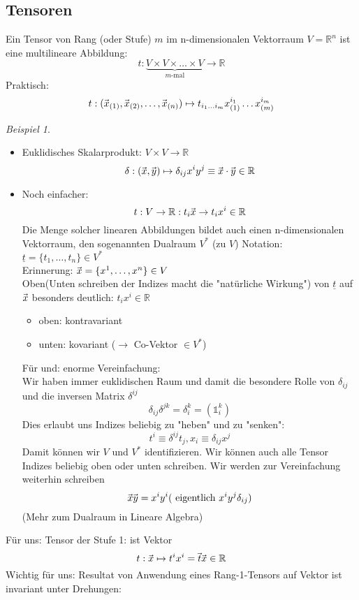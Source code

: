 \documentclass[a4paper]{scrartcl}
\renewcommand{\v}[1]{\mathrlap{\vec{\mkern-2mu\phantom{#1}}}#1}
\theoremstyle{definition}
\theoremstyle{plain}
\theoremstyle{remark}
\theoremstyle{remark}
\newtheorem{ex}{Beispiel}
\newcommand{\ubar}[1]{\underline{#1}}
\begin{document}
\subsection{Tensoren}
\label{sec-6-4}
Ein Tensor von Rang (oder Stufe) $m$ im n-dimensionalen Vektorraum $V = \mathbb{R}^n$ ist eine multilineare Abbildung:
\[t:\underbrace{V\times V\times \ldots \times V}_{m\text{-mal}} \to \mathbb{R}\]
Praktisch:
\[t: (\v x_{(1)}, \v x_{(2)}, \ldots, \v x_{(n)}) \mapsto t_{i_1 \ldots i_m} x_{(1)}^{i_1} \ldots x_{(m)}^{i_m} \]
\begin{ex}
\begin{itemize}
\item Euklidisches Skalarprodukt: $V\times V \to \mathbb{R}$
     \[\delta: (\v x, \v y) \mapsto \delta_{ij} x^i y^j \equiv \v x \cdot \v y \in \mathbb{R}\]
\item Noch einfacher:
\[t: V \to \mathbb{R}: t_i \v x \to t_i x^i \in \mathbb{R}\]
Die Menge solcher linearen Abbildungen bildet auch einen n-dimensionalen Vektorraum, den sogenannten Dualraum $V^\ast$ (zu $V$)
Notation: $\ubar t = \{t_1, \ldots, t_n\} \in V^\ast$ \\
     Erinnerung: $\v x = \{x^1, \ldots, x^n\} \in V$ \\
     Oben(Unten schreiben der Indizes macht die "natürliche Wirkung") von $\ubar t$ auf $\v x$ besonders deutlich: $t_i x^i \in \mathbb{R}$
\begin{itemize}
\item oben: kontravariant
\item unten: kovariant ($\rightarrow$ Co-Vektor $\in V^\ast$)
\end{itemize}
Für und: enorme Vereinfachung: \\
     Wir haben immer euklidischen Raum und damit die besondere Rolle von $\delta_{ij}$ und die inversen Matrix $\delta^{ij}$
\[\delta_{ij} \delta^{jk} = \delta_i^k = (\mathbb{1}_i^k)\]
Dies erlaubt uns Indizes beliebig zu "heben" und zu "senken":
\[t^i \equiv \delta^{ij} t_j, x_i \equiv \delta_{ij}x^j\]
Damit können wir $V$ und $V^\ast$ identifizieren. Wir können auch alle Tensor Indizes beliebig oben oder unten schreiben.
Wir werden zur Vereinfachung weiterhin schreiben
\[\v x \v y = x^i y^i (~\text{eigentlich}~x^i y^j \delta_{ij})\]
(Mehr zum Dualraum in Lineare Algebra)
\end{itemize}
\end{ex}
Für uns: Tensor der Stufe 1: ist Vektor
\[t: \v x \mapsto t^i x^i = \v t \v x \in \mathbb{R}\]
Wichtig für uns: Resultat von Anwendung eines Rang-1-Tensors auf Vektor ist invariant unter Drehungen:
\end{document}
